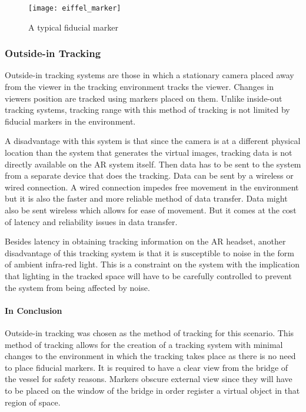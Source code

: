 \begin{figure}[linewidth]
	\centering
	\texttt{[image: eiffel\_marker]}
	\caption{A typical fiducial marker}
	\label{fig:eiffel_marker}
\end{figure}

\subsubsection{Outside-in Tracking}
Outside-in tracking systems are those in which a stationary camera placed away from the viewer in the tracking environment tracks the viewer. Changes in viewers position are tracked using markers placed on them. Unlike inside-out tracking systems, tracking range with this method of tracking is not limited by fiducial markers in the environment. 

A disadvantage with this system is that since the camera is at a different physical location than the system that generates the virtual images, tracking data is not directly available on the AR system itself. Then data has to be sent to the system from a separate device that does the tracking. Data can be sent by a wireless or wired connection. A wired connection impedes free movement in the environment but it is also the faster and more reliable method of data transfer. Data might also be sent wireless which allows for ease of movement. But it comes at the cost of latency and reliability issues in data transfer. 

Besides latency in obtaining tracking information on the AR headset, another disadvantage of this tracking system is that it is susceptible to noise in the form of ambient infra-red light. This is a constraint on the system with the implication that lighting in the tracked space will have to be carefully controlled to prevent the system from being affected by noise.

\paragraph{In Conclusion}
Outside-in tracking was chosen as the method of tracking for this scenario. This method of tracking allows for the creation of a tracking system with minimal changes to the environment in which the tracking takes place as there is no need to place fiducial markers. It is required to have a clear view from the bridge of the vessel for safety reasons. Markers obscure external view since they will have to be placed on the window of the bridge in order register a virtual object in that region of space.
